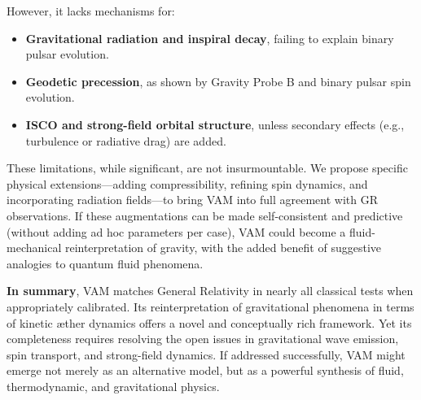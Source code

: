 However, it lacks mechanisms for:

\begin{itemize}
    \item \textbf{Gravitational radiation and inspiral decay}, failing to explain binary pulsar evolution.
    \item \textbf{Geodetic precession}, as shown by Gravity Probe B and binary pulsar spin evolution.
    \item \textbf{ISCO and strong-field orbital structure}, unless secondary effects (e.g., turbulence or radiative drag) are added.
\end{itemize}

These limitations, while significant, are not insurmountable. We propose specific physical extensions—adding compressibility, refining spin dynamics, and incorporating radiation fields—to bring VAM into full agreement with GR observations. If these augmentations can be made self-consistent and predictive (without adding ad hoc parameters per case), VAM could become a fluid-mechanical reinterpretation of gravity, with the added benefit of suggestive analogies to quantum fluid phenomena.

\textbf{In summary}, VAM matches General Relativity in nearly all classical tests when appropriately calibrated. Its reinterpretation of gravitational phenomena in terms of kinetic æther dynamics offers a novel and conceptually rich framework. Yet its completeness requires resolving the open issues in gravitational wave emission, spin transport, and strong-field dynamics. If addressed successfully, VAM might emerge not merely as an alternative model, but as a powerful synthesis of fluid, thermodynamic, and gravitational physics.